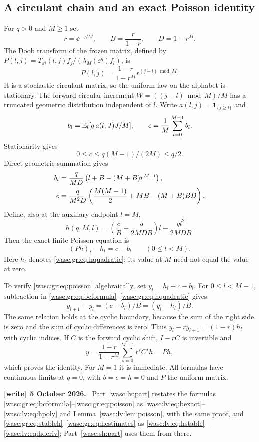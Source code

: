 \documentclass[11pt,a4paper]{article}
\theoremstyle{remark}\newtheorem{remark}[theorem]{Remark}
\newcommand{\ind}{\mathbf 1}\newcommand{\wasc}{\operatorname{wasc}}\newcommand{\dasc}{\operatorname{dasc}}
\numberwithin{equation}{section}
\newenvironment{writenote}[1][]{\par\smallskip\begingroup\small
 \noindent\textbf{[write]}\if\relax\detokenize{#1}\relax\else~\textbf{#1.}\fi\ }%
 {\par\endgroup\smallskip}
\begin{document}
\subsection{A circulant chain and an exact Poisson identity}
For $q>0$ and $M\ge1$ set
\[
r=\ee^{-q/M},\qquad B=\frac r{1-r},\qquad D=1-r^M.
\]
The Doob transform of the frozen matrix, defined by
$P(l,j)=T_{\ee^q}(l,j)f_j/(\lambda_M(\ee^q)f_l)$, is
\begin{equation}\label{wasc:gr:eq:doob}
P(l,j)=\frac{1-r}{1-r^M}r^{(j-l)\bmod M}.
\end{equation}
It is a stochastic circulant matrix, so the uniform law on the alphabet is stationary. The forward circular increment $W=((j-l)\bmod M)/M$ has a truncated geometric distribution independent of $l$. Write $a(l,j)=\ind_{\{j\ge l\}}$ and
\begin{equation}\label{wasc:gr:eq:bcdef}
b_l=\mathbb E_l[q\,a(l,J)J/M],\qquad c=\frac1M\sum_{l=0}^{M-1}b_l.
\end{equation}
Stationarity gives
\begin{equation}\label{wasc:gr:eq:cupper}
0\le c\le q(M-1)/(2M)\le q/2.
\end{equation}
Direct geometric summation gives
\begin{align}\label{wasc:gr:eq:bcformula}
b_l&=\frac q{MD}\left(l+B-(M+B)r^{M-l}\right),\notag\\
c&=\frac q{M^2D}\left(\frac{M(M-1)}2+MB-(M+B)BD\right).
\end{align}
Define, also at the auxiliary endpoint $l=M$,
\begin{equation}\label{wasc:gr:eq:hquadratic}
h(q,M,l)=\left(\frac cB+\frac q{2MDB}\right)l-\frac{ql^2}{2MDB}.
\end{equation}
Then the exact finite Poisson equation is
\begin{equation}\label{wasc:gr:eq:poisson}
(Ph)_l-h_l=c-b_l\qquad(0\le l<M).
\end{equation}
Here $h_l$ denotes \eqref{wasc:gr:eq:hquadratic}; its value at $M$ need not equal the value at zero.

To verify \eqref{wasc:gr:eq:poisson} algebraically, set $y_l=h_l+c-b_l$. For $0\le l<M-1$, subtraction in \eqref{wasc:gr:eq:bcformula}--\eqref{wasc:gr:eq:hquadratic} gives
\[
y_{l+1}-y_l=(c-b_l)/B=(y_l-h_l)/B.
\]
The same relation holds at the cyclic boundary, because the sum of the right side is zero and the sum of cyclic differences is zero. Thus $y_l-r y_{l+1}=(1-r)h_l$ with cyclic indices. If $C$ is the forward cyclic shift, $I-rC$ is invertible and
\[
y=\frac{1-r}{1-r^M}\sum_{s=0}^{M-1}r^s C^s h=Ph,
\]
which proves the identity. For $M=1$ it is immediate. All formulas have continuous limits at $q=0$, with $b=c=h=0$ and $P$ the uniform matrix.
\begin{writenote}[5 October 2026]
Part~\ref{wasc:lv:part} restates the formulas \eqref{wasc:gr:eq:bcformula}--\eqref{wasc:gr:eq:poisson} as \eqref{wasc:lv:eq:bexact}--\eqref{wasc:lv:eq:hpoly} and Lemma~\ref{wasc:lv:lem:poisson}, with the same proof, and \eqref{wasc:gr:eq:stableh}--\eqref{wasc:gr:eq:hestimates} as \eqref{wasc:lv:eq:hstable}--\eqref{wasc:lv:eq:hderiv}; Part~\ref{wasc:sh:part} uses them from there.
\end{writenote}
\end{document}
